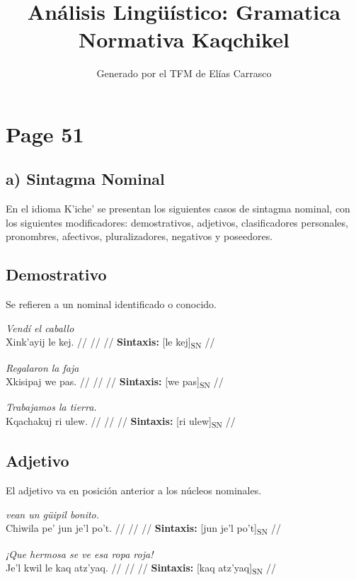 \documentclass{article}%
\title{Análisis Lingüístico: Gramatica Normativa Kaqchikel}%
\author{Generado por el TFM de Elías Carrasco}%
\begin{document}
%
\normalsize%
\maketitle%
\section{Page 51}%
\label{sec:Page51}%
\subsection{a) Sintagma Nominal}%
\label{subsec:a)SintagmaNominal}%

%
En el idioma K’iche’ se presentan los siguientes casos de sintagma nominal, con los %
siguientes modificadores: demostrativos, adjetivos, clasificadores personales, pronombres, %
afectivos, pluralizadores, negativos y poseedores. %
\subsection{Demostrativo}%
\label{subsec:Demostrativo}%

%
Se refieren a un nominal identificado o conocido. %
\par\medskip%
\ex
\textit{Vendí el caballo} \\
\begingl
\gla Xink’ayij le kej. //
\glb  //
\glc  //
\glft \textbf{Sintaxis:} [le kej]\textsubscript{SN} //
\endgl
\xe
%
\medskip%
\par\medskip%
\ex
\textit{Regalaron la faja} \\
\begingl
\gla Xkisipaj we pas. //
\glb  //
\glc  //
\glft \textbf{Sintaxis:} [we pas]\textsubscript{SN} //
\endgl
\xe
%
\medskip%
\par\medskip%
\ex
\textit{Trabajamos la tierra.} \\
\begingl
\gla Kqachakuj ri ulew. //
\glb  //
\glc  //
\glft \textbf{Sintaxis:} [ri ulew]\textsubscript{SN} //
\endgl
\xe
%
\medskip%
\subsection{Adjetivo}%
\label{subsec:Adjetivo}%

%
El adjetivo va en posición anterior a los núcleos nominales. %
\par\medskip%
\ex
\textit{vean un güipil bonito.} \\
\begingl
\gla Chiwila pe’ jun je’l po’t. //
\glb  //
\glc  //
\glft \textbf{Sintaxis:} [jun je’l po’t]\textsubscript{SN} //
\endgl
\xe
%
\medskip%
\par\medskip%
\ex
\textit{¡Que hermosa se ve esa ropa roja!} \\
\begingl
\gla Je’l kwil le kaq atz’yaq. //
\glb  //
\glc  //
\glft \textbf{Sintaxis:} [kaq atz’yaq]\textsubscript{SN} //
\endgl
\xe
%
\medskip%
\end{document}
